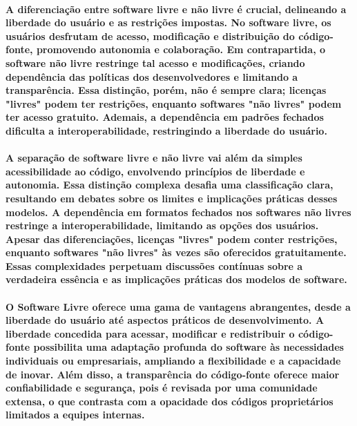 \documentclass[a4paper, 12pt]{article}
\begin{document}
\paragraph{A diferenciação entre software livre e não livre é crucial, delineando a liberdade do usuário e as restrições impostas. No software livre, os usuários desfrutam de acesso, modificação e distribuição do código-fonte, promovendo autonomia e colaboração. Em contrapartida, o software não livre restringe tal acesso e modificações, criando dependência das políticas dos desenvolvedores e limitando a transparência. Essa distinção, porém, não é sempre clara; licenças "livres" podem ter restrições, enquanto softwares "não livres" podem ter acesso gratuito. Ademais, a dependência em padrões fechados dificulta a interoperabilidade, restringindo a liberdade do usuário.}
\paragraph{A separação de software livre e não livre vai além da simples acessibilidade ao código, envolvendo princípios de liberdade e autonomia. Essa distinção complexa desafia uma classificação clara, resultando em debates sobre os limites e implicações práticas desses modelos. A dependência em formatos fechados nos softwares não livres restringe a interoperabilidade, limitando as opções dos usuários. Apesar das diferenciações, licenças "livres" podem conter restrições, enquanto softwares "não livres" às vezes são oferecidos gratuitamente. Essas complexidades perpetuam discussões contínuas sobre a verdadeira essência e as implicações práticas dos modelos de software.}

\paragraph{O Software Livre oferece uma gama de vantagens abrangentes, desde a liberdade do usuário até aspectos práticos de desenvolvimento. A liberdade concedida para acessar, modificar e redistribuir o código-fonte possibilita uma adaptação profunda do software às necessidades individuais ou empresariais, ampliando a flexibilidade e a capacidade de inovar. Além disso, a transparência do código-fonte oferece maior confiabilidade e segurança, pois é revisada por uma comunidade extensa, o que contrasta com a opacidade dos códigos proprietários limitados a equipes internas.}
\end{document}
